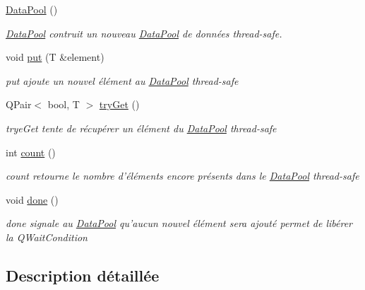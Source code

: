 \begin{DoxyCompactItemize}
\item 
\hypertarget{class_data_pool_a0e93f42b7be1b1ffa03a79a9220cca2c}{\hyperlink{class_data_pool_a0e93f42b7be1b1ffa03a79a9220cca2c}{Data\+Pool} ()}\label{class_data_pool_a0e93f42b7be1b1ffa03a79a9220cca2c}

\begin{DoxyCompactList}\small\item\em \hyperlink{class_data_pool}{Data\+Pool} contruit un nouveau \hyperlink{class_data_pool}{Data\+Pool} de données thread-\/safe. \end{DoxyCompactList}\item 
void \hyperlink{class_data_pool_af87b1ba98e148de273975fbbf2d6eb49}{put} (T \&element)
\begin{DoxyCompactList}\small\item\em put ajoute un nouvel élément au \hyperlink{class_data_pool}{Data\+Pool} thread-\/safe \end{DoxyCompactList}\item 
Q\+Pair$<$ bool, T $>$ \hyperlink{class_data_pool_a4b46a347e1fa6b3eeafed9d77eb7eaa7}{try\+Get} ()
\begin{DoxyCompactList}\small\item\em trye\+Get tente de récupérer un élément du \hyperlink{class_data_pool}{Data\+Pool} thread-\/safe \end{DoxyCompactList}\item 
int \hyperlink{class_data_pool_a0ee10a72e547a3de6c24a3997a961c85}{count} ()
\begin{DoxyCompactList}\small\item\em count retourne le nombre d'éléments encore présents dans le \hyperlink{class_data_pool}{Data\+Pool} thread-\/safe \end{DoxyCompactList}\item 
\hypertarget{class_data_pool_a0760141bdcfcbd2d9992a5ccaf064ce8}{void \hyperlink{class_data_pool_a0760141bdcfcbd2d9992a5ccaf064ce8}{done} ()}\label{class_data_pool_a0760141bdcfcbd2d9992a5ccaf064ce8}

\begin{DoxyCompactList}\small\item\em done signale au \hyperlink{class_data_pool}{Data\+Pool} qu'aucun nouvel élément sera ajouté permet de libérer la Q\+Wait\+Condition \end{DoxyCompactList}\end{DoxyCompactItemize}


\subsection{Description détaillée}
